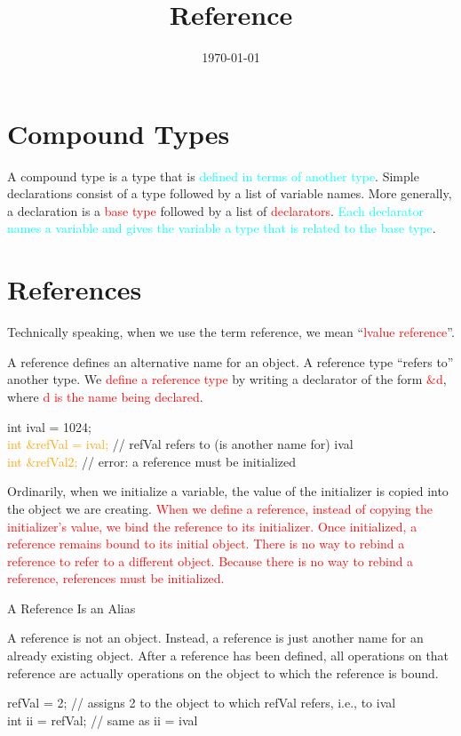 \documentclass[12pt,a4paper]{article}
\title{Reference}
\author{}
\date{\today}
\begin{document}
\maketitle
\section{Compound Types}
A compound type is a type that is \textcolor{cyan}{defined in terms of another type}. Simple declarations consist of a type followed by a list of variable names. More generally, a declaration is a \textcolor{red}{base type} followed by a list of \textcolor{red}{declarators}. \textcolor{cyan}{Each declarator names a variable and gives the variable a type that is related to the base type}.

\section{References}
Technically speaking, when we use the term reference, we mean ``\textcolor{red}{lvalue reference}”.

A reference defines an alternative name for an object. A reference type ``refers to” another type. We \textcolor{red}{define a reference type} by writing a declarator of the form \textcolor{red}{$\&$d}, where \textcolor{red}{d is the name being declared}.

int ival = 1024; \\
\textcolor{orange}{int $\&$refVal = ival;} // refVal refers to (is another name for) ival \\
\textcolor{orange}{int $\&$refVal2;} // error: a reference must be initialized

Ordinarily, when we initialize a variable, the value of the initializer is copied into the object we are creating. \textcolor{red}{When we define a reference, instead of copying the initializer’s value, we bind the reference to its initializer. Once initialized, a reference remains bound to its initial object. There is no way to rebind a reference to refer to a different object. Because there is no way to rebind a reference, references must be initialized.}

A Reference Is an Alias

A reference is not an object. Instead, a reference is just another name for an already existing object. After a reference has been defined, all operations on that reference are actually operations on the object to which the reference is bound. 

refVal = 2; // assigns 2 to the object to which refVal refers, i.e., to ival \\
int ii = refVal; // same as ii = ival
\end{document}
